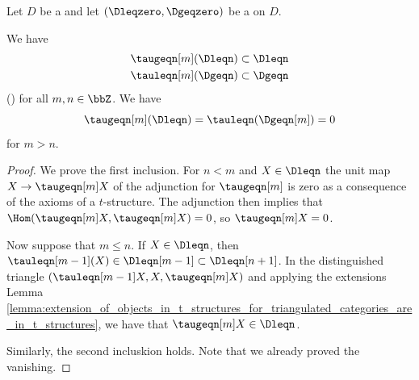 \begin{lemma} \label{lemma:compatibility_of_t_structure_on_triangulated_category_with_truncation_functor}
    Let $D$ be a  and let $(\Dleqzero, \Dgeqzero)$ be a  on $D$.

    We have 
    \begin{align*}
        \taugeqn[m](\Dleqn) &\subset \Dleqn \\
        \tauleqn[m](\Dgeqn) &\subset \Dgeqn \\
    \end{align*}
    ()
    for all $m,n \in \bbZ$. We have 
    $$\taugeqn[m](\Dleqn) = \tauleqn(\Dgeqn[m]) = 0$$
    for $m > n$.
\end{lemma}

\begin{proof}
    We prove the first inclusion. For $n < m$ and $X \in \Dleqn$ the unit map $X \to \taugeqn[m] X$ of the adjunction for $\taugeqn[m]$ is zero as a consequence of the axioms of a $t$-structure. The adjunction then implies that $\Hom(\taugeqn[m] X, \taugeqn[m] X) = 0$, so $\taugeqn[m] X = 0$. 

    Now suppose that $m \leq n$. If $X \in \Dleqn$, then $\tauleqn[m-1](X) \in \Dleqn[m-1] \subset \Dleqn[n+1]$. In the distinguished triangle $(\tauleqn[m-1] X , X , \taugeqn[m] X)$ and applying the extensions Lemma \ref{lemma:extension_of_objects_in_t_structures_for_triangulated_categories_are_in_t_structures}, we have that $\taugeqn[m] X \in \Dleqn$.

    Similarly, the second incluskion holds. Note that we already proved the vanishing.
\end{proof}
